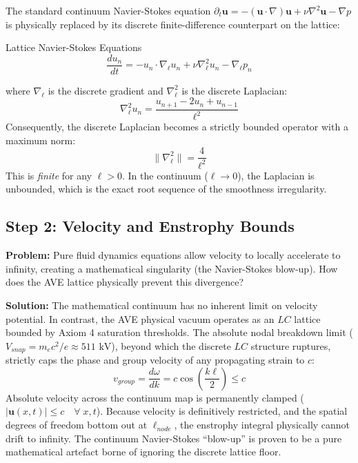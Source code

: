The standard continuum Navier-Stokes equation $\partial_t \mathbf{u} = -(\mathbf{u}\cdot\nabla)\mathbf{u} + \nu\nabla^2\mathbf{u} - \nabla p$ is physically replaced by its discrete finite-difference counterpart on the lattice:
\begin{resultbox}{Lattice Navier-Stokes Equations}
\begin{equation}
    \frac{du_n}{dt} = -u_n \cdot \nabla_{\ell} u_n
    + \nu \nabla^2_{\ell} u_n - \nabla_{\ell} p_n
    \label{eq:lattice_ns}
\end{equation}
\end{resultbox}
where $\nabla_{\ell}$ is the discrete gradient and $\nabla^2_{\ell}$ is the discrete Laplacian:
\begin{equation}
    \nabla^2_{\ell} u_n
    = \frac{u_{n+1} - 2u_n + u_{n-1}}{\ell^2}
    \label{eq:discrete_laplacian}
\end{equation}
Consequently, the discrete Laplacian becomes a strictly bounded operator with a maximum norm:
\begin{equation}
    \| \nabla^2_{\ell} \| = \frac{4}{\ell^2}
    \label{eq:laplacian_norm}
\end{equation}
This is \textit{finite} for any $\ell > 0$. In the continuum ($\ell \to 0$), the Laplacian is unbounded, which is the exact root sequence of the smoothness irregularity.

\subsection{Step 2: Velocity and Enstrophy Bounds}

\begin{examplebox}
\textbf{Problem:} Pure fluid dynamics equations allow velocity to locally accelerate to infinity, creating a mathematical singularity (the Navier-Stokes blow-up). How does the AVE lattice physically prevent this divergence?

\textbf{Solution:} The mathematical continuum has no inherent limit on velocity potential. In contrast, the AVE physical vacuum operates as an $LC$ lattice bounded by Axiom 4 saturation thresholds. The absolute nodal breakdown limit ($V_{snap} = m_e c^2/e \approx 511\text{ kV}$), beyond which the discrete $LC$ structure ruptures, strictly caps the phase and group velocity of any propagating strain to $c$:
\[ v_{group} = \frac{d\omega}{dk} = c\cos\!\left(\frac{k\ell}{2}\right) \le c \]
Absolute velocity across the continuum map is permanently clamped ($|\mathbf{u}(x,t)| \le c \quad \forall\; x, t$). Because velocity is definitively restricted, and the spatial degrees of freedom bottom out at $\ell_{node}$, the enstrophy integral physically cannot drift to infinity. The continuum Navier-Stokes ``blow-up'' is proven to be a pure mathematical artefact borne of ignoring the discrete lattice floor.
\end{examplebox}

